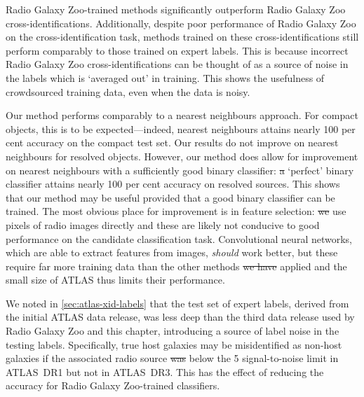 \documentclass[11pt, a4paper]{book}
\providecommand{\DIFaddtex}[1]{{\protect\color{blue}\uwave{#1}}} %
\providecommand{\DIFdeltex}[1]{{\protect\color{red}\sout{#1}}}                      %
\providecommand{\DIFaddbegin}{} %
\providecommand{\DIFaddend}{} %
\providecommand{\DIFdelbegin}{} %
\providecommand{\DIFdelend}{} %
\providecommand{\DIFadd}[1]{\texorpdfstring{\DIFaddtex{#1}}{#1}} %
\providecommand{\DIFdel}[1]{\texorpdfstring{\DIFdeltex{#1}}{}} %
\newcommand{\DIFscaledelfig}{0.5}
\newlength{\DIFdelgraphicswidth} %
\newlength{\DIFdelgraphicsheight} %
\newcommand{\DIFaddincludegraphics}[2][]{{\color{blue}\fbox{\DIFOincludegraphics[#1]{#2}}}} %
\newcommand{\DIFdelincludegraphics}[2][]{%
\sbox{\DIFdelgraphicsbox}{\DIFOincludegraphics[#1]{#2}}%
\settoboxwidth{\DIFdelgraphicswidth}{\DIFdelgraphicsbox} %
\settoboxtotalheight{\DIFdelgraphicsheight}{\DIFdelgraphicsbox} %
\scalebox{\DIFscaledelfig}{%
\parbox[b]{\DIFdelgraphicswidth}{\usebox{\DIFdelgraphicsbox}\\[-\baselineskip] \rule{\DIFdelgraphicswidth}{0em}}\llap{\resizebox{\DIFdelgraphicswidth}{\DIFdelgraphicsheight}{%
\setlength{\unitlength}{\DIFdelgraphicswidth}%
\begin{picture}(1,1)%
\thicklines\linethickness{2pt} %
{\color[rgb]{1,0,0}\put(0,0){\framebox(1,1){}}}%
{\color[rgb]{1,0,0}\put(0,0){\line( 1,1){1}}}%
{\color[rgb]{1,0,0}\put(0,1){\line(1,-1){1}}}%
\end{picture}%
}\hspace*{3pt}}} %
} %
\DeclareRobustCommand{\DIFaddbegin}{\DIFOaddbegin \let\includegraphics\DIFaddincludegraphics} %
\DeclareRobustCommand{\DIFaddend}{\DIFOaddend \let\includegraphics\DIFOincludegraphics} %
\DeclareRobustCommand{\DIFdelbegin}{\DIFOdelbegin \let\includegraphics\DIFdelincludegraphics} %
\DeclareRobustCommand{\DIFdelend}{\DIFOaddend \let\includegraphics\DIFOincludegraphics} %
\begin{document}
    Radio Galaxy Zoo-trained methods significantly outperform Radio Galaxy Zoo
    cross-identifications. Additionally, despite poor performance of Radio
    Galaxy Zoo on the cross-identification task, methods trained on these
    cross-identifications still perform comparably to those trained on expert
    labels. This is because incorrect Radio Galaxy Zoo cross-identifications
    can be thought of as a source of noise in the labels which is `averaged out'
    in training. This shows the usefulness of crowdsourced training data, even
    when the data is noisy.

    Our method performs comparably to a nearest neighbours approach. For
    compact objects, this is to be expected---indeed, nearest neighbours
    attains nearly 100 per cent accuracy on the compact test set. Our results
    do not improve on nearest neighbours for resolved objects. However, our
    method does allow for improvement on nearest neighbours with a
    sufficiently good binary classifier: \DIFdelbegin \DIFdel{a }\DIFdelend \DIFaddbegin \DIFadd{A }\DIFaddend `perfect' binary classifier attains
    nearly 100 per cent accuracy on resolved sources. This shows that our
    method may be useful provided that a good binary classifier can be
    trained. The most obvious place for improvement is in feature selection:
    \DIFdelbegin \DIFdel{we }\DIFdelend \DIFaddbegin \DIFadd{We }\DIFaddend use pixels of radio images directly and these are likely not conducive
    to good performance on the candidate classification task. Convolutional
    neural networks, which are able to extract features from images,
    \emph{should} work better, but these require far more training data than
    the other methods \DIFdelbegin \DIFdel{we have }\DIFdelend \DIFaddbegin \DIFadd{that we }\DIFaddend applied and the small size of ATLAS thus limits their performance.

    We noted in \autoref{sec:atlas-xid-labels} that the test set of expert labels,
    derived from the initial ATLAS data release, was less deep than the third
    data release used by Radio Galaxy Zoo and this chapter, introducing a source
    of label noise in the testing labels. Specifically, true host galaxies may
    be misidentified as non-host galaxies if the associated radio source \DIFdelbegin \DIFdel{was
    }\DIFdelend \DIFaddbegin \DIFadd{is
    }\DIFaddend below the 5 signal-to-noise limit in ATLAS~DR1 but not in ATLAS~DR3. This
    has the effect of reducing the accuracy for Radio Galaxy Zoo-trained
    classifiers.
\end{document}
